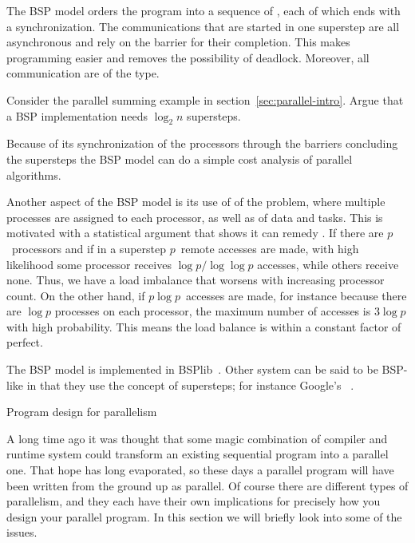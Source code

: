 The \ac{BSP} model orders the program into a sequence of
, each of which ends with a 
synchronization.  The communications that are started in one superstep
are all asynchronous and rely on the barrier for their completion.  This
makes programming easier and removes the possibility of deadlock.
Moreover, all communication are of the 
type.

\begin{exercise}
  Consider the parallel summing example in
  section~\ref{sec:parallel-intro}. Argue that a \ac{BSP}
  implementation needs $\log_2n$ supersteps.
\end{exercise}

Because of its synchronization of the processors through the barriers
concluding the supersteps the \ac{BSP} model can do a simple cost
analysis of parallel algorithms. 

Another aspect of the \ac{BSP} model is its use of  of the
problem, where multiple processes are assigned to each processor, as well as
 of data and tasks. This is motivated with a statistical
argument that shows it can remedy .
If there are $p$~processors and if in a superstep $p$~remote accesses are made,
with high likelihood some processor receives $\log p/\log \log p$ accesses, while
others receive none. Thus, we have a load imbalance that worsens with increasing
processor count. On the other hand, if $p\log p$~accesses are made, for
instance because there are $\log p$ processes on each processor, the maximum
number of accesses is $3\log p$ with high probability. This means the load balance 
is within a constant factor of perfect.

The \ac{BSP} model is implemented in BSPlib~\cite{BSPlib}.
Other system can be said to be BSP-like in that they use the concept
of supersteps; for instance Google's
~\cite{Pregel:podc2009}.

 {Program design for parallelism}
\label{sec:aos-soa}

A long time ago it was thought that some magic combination of 
compiler and runtime system could transform an existing sequential 
program into a parallel one. That hope has long evaporated, so these
days a parallel program will have been written from the ground up as parallel.
Of course there are different types of parallelism, and they each have
their own implications for precisely how you design your parallel program.
In this section we will briefly look into some of the issues.

